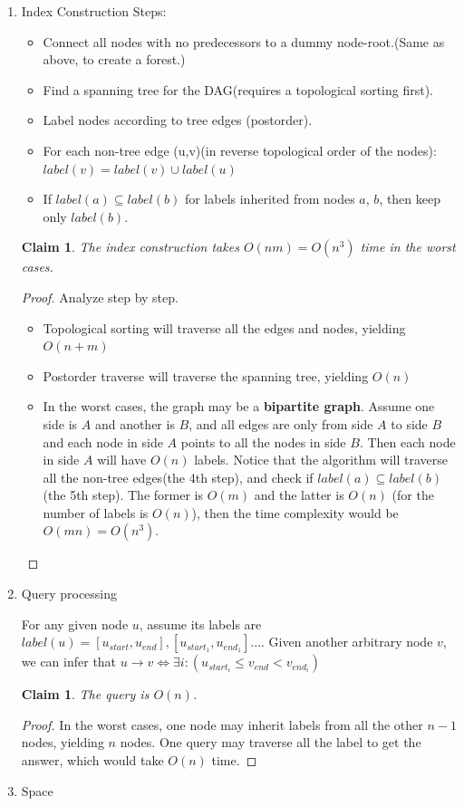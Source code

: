 \documentclass[11pt]{article}
\newtheorem{claim}[theorem]{Claim}
\begin{document}
\begin{enumerate}
	\item Index Construction
	Steps: 
	\begin{itemize}
		\item Connect all nodes with no predecessors to a dummy 
		node-root.(Same as above, to create a forest.)
		\item Find a spanning tree for the DAG(requires a 
		topological sorting first).
		\item Label nodes according to tree edges (postorder).
		\item For each non-tree edge (u,v)(in reverse topological 
		order of the nodes): $label(v) = label(v)\cup label(u)$
		\item If $label(a)\subseteq label(b)$ for labels inherited from 
		nodes $a$, $b$, then keep only $label(b)$.
	\end{itemize}
	\begin{claim}
		The index construction takes $O(nm) = O(n^3)$ time in the worst cases.
	\end{claim}
	\begin{proof}
		Analyze step by step.
		\begin{itemize}
			\item Topological sorting will traverse all the edges and nodes, yielding $O(n+m)$
			\item Postorder traverse will traverse the spanning tree, yielding $O(n)$
			\item In the worst cases, the graph may be a \textbf{bipartite graph}. Assume one side is $A$ and another is $B$, and all edges are only from side $A$ to side $B$ and each node in side $A$ points to all the nodes in side $B$. Then each node in side $A$ will have $O(n)$ labels. Notice that the algorithm will traverse all the non-tree edges(the 4th step), and check if $label(a)\subseteq label(b)$(the 5th step). The former is $O(m)$ and the latter is $O(n)$ (for the number of labels is $O(n)$), then the time complexity would be $O(mn) = O(n^3)$.  
		\end{itemize}
	\end{proof}
	\item Query processing
		
	 For any given node $u$, assume its labels are $label(u)={[u_{start},u_{end}],[u_{start_1},u_{end_1}]...}$. Given another arbitrary node $v$, we can infer that $u\rightarrow v \Leftrightarrow \exists i: (u_{start_i}\leq v_{end}<v_{end_i})$
	 \begin{claim}
	 	The query is $O(n)$.
	 \end{claim}
	 \begin{proof}
	 	In the worst cases, one node may inherit labels from all the other $n-1$ nodes, yielding $n$ nodes. One query may traverse all the label to get the answer, which would take $O(n)$ time.
	 \end{proof}	
	\item Space
	

\end{enumerate}
\end{document}
